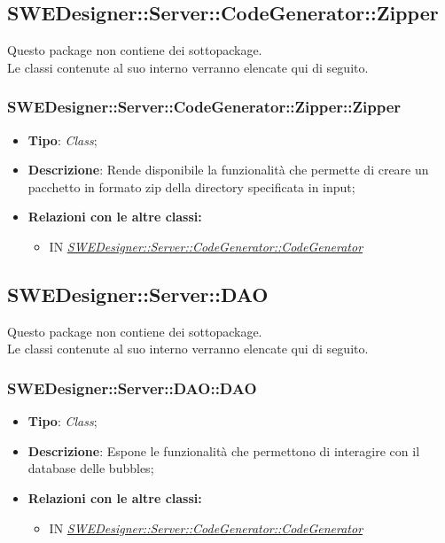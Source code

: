 \documentclass[../SpecificaTecnica.tex]{subfiles}
\begin{document}
			
			
			
			
			\subsection{SWEDesigner::Server::CodeGenerator::Zipper}
			Questo package non contiene dei sottopackage.\\
			Le classi contenute al suo interno verranno elencate qui di seguito.
			
			\subsubsection{SWEDesigner::Server::CodeGenerator::Zipper::Zipper}
			\hypertarget{SWEDesigner::Server::CodeGenerator::Builder::Builder}{}
			\begin{itemize}
				\item \textbf{Tipo}: \emph{Class};
				\item \textbf{Descrizione}: Rende disponibile la funzionalità che permette di creare un pacchetto in formato zip della directory specificata in input; \\
				\item \textbf{Relazioni con le altre classi:}
				\begin{itemize}
					\item IN \hyperlink{SWEDesigner::Server::CodeGenerator::CodeGenerator}{\emph{SWEDesigner::Server::CodeGenerator::CodeGenerator}}
				\end{itemize}	
			\end{itemize}
			
			
			\subsection{SWEDesigner::Server::DAO}
			Questo package non contiene dei sottopackage.\\
			Le classi contenute al suo interno verranno elencate qui di seguito.
			\subsubsection{SWEDesigner::Server::DAO::DAO}
			\hypertarget{SWEDesigner::Server::DAO::DAO}{}
			\begin{itemize}
				\item \textbf{Tipo}: \emph{Class};
				\item \textbf{Descrizione}: Espone le funzionalità che permettono di interagire con il database delle bubbles; \\
				\item \textbf{Relazioni con le altre classi:}
				\begin{itemize}
					\item IN \hyperlink{SWEDesigner::Server::RequestHandler::RequestHandler}{\emph{SWEDesigner::Server::CodeGenerator::CodeGenerator}}
				\end{itemize}	
			\end{itemize}
			
\end{document}
